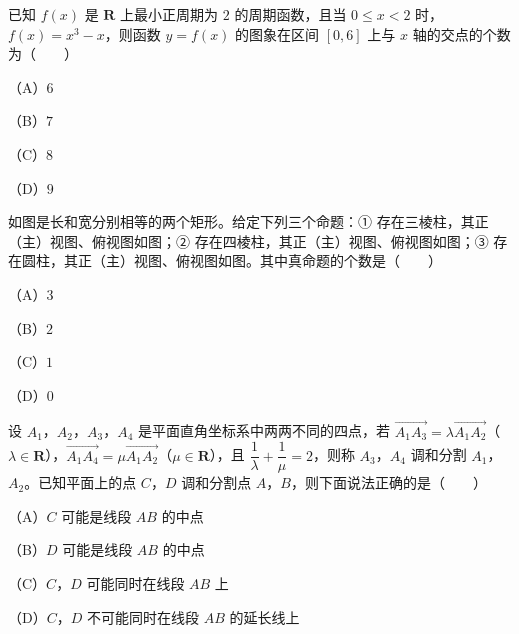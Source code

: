 \begin{question}
已知 $f(x)$ 是 $\mathbf R$ 上最小正周期为 $2$ 的周期函数，且当 $0\leqslant x<2$ 时，$f(x)=x^3-x$，则函数 $y=f(x)$ 的图象在区间 $[0,6]$ 上与 $x$ 轴的交点的个数为\mbox{（　　）}

（A）$6$

（B）$7$

（C）$8$

（D）$9$

\Needspace{0.4\textheight}
\end{question}
\begin{question}
如图是长和宽分别相等的两个矩形。给定下列三个命题：① 存在三棱柱，其正（主）视图、俯视图如图；② 存在四棱柱，其正（主）视图、俯视图如图；③ 存在圆柱，其正（主）视图、俯视图如图。其中真命题的个数是\mbox{（　　）}

（A）$3$

（B）$2$

（C）$1$

（D）$0$
\nopagebreak[4]
\begin{center}\end{center}
\nopagebreak[4]
\end{question}
\begin{question}
设 $A_1$，$A_2$，$A_3$，$A_4$ 是平面直角坐标系中两两不同的四点，若 $\overrightarrow{A_1A_3}=\lambda\overrightarrow{A_1A_2}$（$\lambda\in\mathbf R$），$\overrightarrow{A_1A_4}=\mu\overrightarrow{A_1A_2}$（$\mu\in\mathbf R$），且 $\dfrac1\lambda+\dfrac1\mu=2$，则称 $A_3$，$A_4$ 调和分割 $A_1$，$A_2$。已知平面上的点 $C$，$D$ 调和分割点 $A$，$B$，则下面说法正确的是\mbox{（　　）}

（A）$C$ 可能是线段 $AB$ 的中点

（B）$D$ 可能是线段 $AB$ 的中点

（C）$C$，$D$ 可能同时在线段 $AB$ 上

（D）$C$，$D$ 不可能同时在线段 $AB$ 的延长线上

\end{question}

